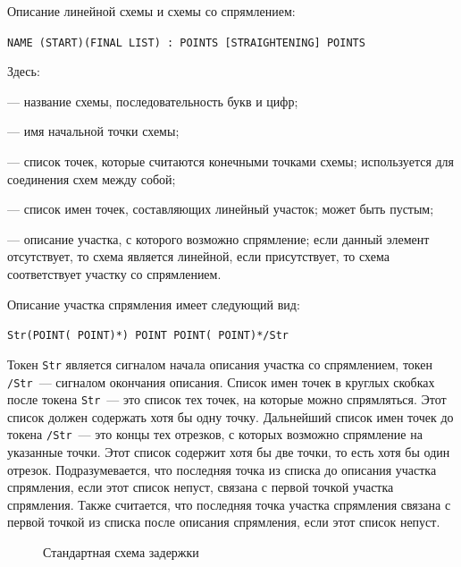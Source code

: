\documentclass[12pt]{article}
\theoremstyle{plain}
\begin{document}
Описание линейной схемы и схемы со спрямлением:
\begin{center}
\verb|NAME (START)(FINAL LIST) : POINTS [STRAIGHTENING] POINTS|
\end{center}
Здесь:
\begin{description}[topsep=-0.5\parsep,itemsep=-0.5\parsep]
  \item[\texttt{NAME}] --- название схемы, последовательность букв и цифр; 
  \item[\texttt{START}] --- имя начальной точки схемы;
  \item[\texttt{FINAL LIST}] --- список точек, которые считаются конечными точками схемы; используется для соединения схем между собой;
  \item[\texttt{POINTS}] --- список имен точек, составляющих линейный участок; может быть пустым;
  \item[\texttt{STRAIGHTENING}] --- описание участка, с которого возможно спрямление; если данный элемент отсутствует, то схема является линейной, если присутствует, то схема соответствует участку со спрямлением.
\end{description}

Описание участка спрямления имеет следующий вид:
\begin{center}
  \verb|Str(POINT( POINT)*) POINT POINT( POINT)*/Str|
\end{center}
Токен \texttt{Str} является сигналом начала описания участка со спрямлением, токен \texttt{/Str}~--- сигналом окончания описания. Список имен точек в круглых скобках после токена \texttt{Str}~--- это список тех точек, на которые можно спрямляться. Этот список должен содержать хотя бы одну точку. Дальнейший список имен точек до токена \texttt{/Str}~--- это концы тех отрезков, с которых возможно спрямление на указанные точки. Этот список содержит хотя бы две точки, то есть хотя бы один отрезок. Подразумевается, что последняя точка из списка до описания участка спрямления, если этот список непуст, связана с первой точкой участка спрямления. Также считается, что последняя точка участка спрямления связана с первой точкой из списка после описания спрямления, если этот список непуст.


\begin{figure}[h]
  \centering


  \caption{Стандартная схема задержки}
  \label{fig:StScheme}
\end{figure}
\end{document}

